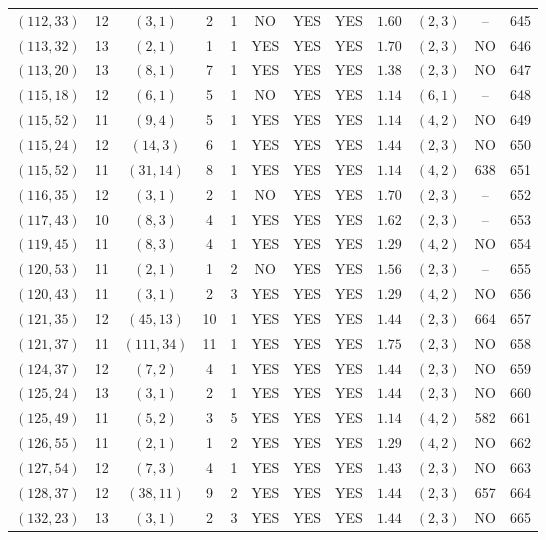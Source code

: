 \begin{longtable}{|c|c|c|c|c|c|c|c|c|c|c|c|}
$(112,33)$ & 12 & $(3,1)$ & 2 & 1 & NO & YES & YES & $1.60$ & $(2,3)$ & -- & 645\\
$(113,32)$ & 13 & $(2,1)$ & 1 & 1 & YES & YES & YES & $1.70$ & $(2,3)$ & NO & 646\\
$(113,20)$ & 13 & $(8,1)$ & 7 & 1 & YES & YES & YES & $1.38$ & $(2,3)$ & NO & 647\\
$(115,18)$ & 12 & $(6,1)$ & 5 & 1 & NO & YES & YES & $1.14$ & $(6,1)$ & -- & 648\\
$(115,52)$ & 11 & $(9,4)$ & 5 & 1 & YES & YES & YES & $1.14$ & $(4,2)$ & NO & 649\\
$(115,24)$ & 12 & $(14,3)$ & 6 & 1 & YES & YES & YES & $1.44$ & $(2,3)$ & NO & 650\\
$(115,52)$ & 11 & $(31,14)$ & 8 & 1 & YES & YES & YES & $1.14$ & $(4,2)$ & 638 & 651\\
$(116,35)$ & 12 & $(3,1)$ & 2 & 1 & NO & YES & YES & $1.70$ & $(2,3)$ & -- & 652\\
$(117,43)$ & 10 & $(8,3)$ & 4 & 1 & YES & YES & YES & $1.62$ & $(2,3)$ & -- & 653\\
$(119,45)$ & 11 & $(8,3)$ & 4 & 1 & YES & YES & YES & $1.29$ & $(4,2)$ & NO & 654\\
$(120,53)$ & 11 & $(2,1)$ & 1 & 2 & NO & YES & YES & $1.56$ & $(2,3)$ & -- & 655\\
$(120,43)$ & 11 & $(3,1)$ & 2 & 3 & YES & YES & YES & $1.29$ & $(4,2)$ & NO & 656\\
$(121,35)$ & 12 & $(45,13)$ & 10 & 1 & YES & YES & YES & $1.44$ & $(2,3)$ & 664 & 657\\
$(121,37)$ & 11 & $(111,34)$ & 11 & 1 & YES & YES & YES & $1.75$ & $(2,3)$ & NO & 658\\
$(124,37)$ & 12 & $(7,2)$ & 4 & 1 & YES & YES & YES & $1.44$ & $(2,3)$ & NO & 659\\
$(125,24)$ & 13 & $(3,1)$ & 2 & 1 & YES & YES & YES & $1.44$ & $(2,3)$ & NO & 660\\
$(125,49)$ & 11 & $(5,2)$ & 3 & 5 & YES & YES & YES & $1.14$ & $(4,2)$ & 582 & 661\\
$(126,55)$ & 11 & $(2,1)$ & 1 & 2 & YES & YES & YES & $1.29$ & $(4,2)$ & NO & 662\\
$(127,54)$ & 12 & $(7,3)$ & 4 & 1 & YES & YES & YES & $1.43$ & $(2,3)$ & NO & 663\\
$(128,37)$ & 12 & $(38,11)$ & 9 & 2 & YES & YES & YES & $1.44$ & $(2,3)$ & 657 & 664\\
$(132,23)$ & 13 & $(3,1)$ & 2 & 3 & YES & YES & YES & $1.44$ & $(2,3)$ & NO & 665\\

\end{longtable}
